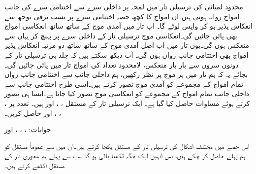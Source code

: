محدود لمبائی کی ترسیلی تار میں لمحہ  پر داخلی سرے سے اختتامی سرے کی جانب  امواج روانہ ہوتی ہیں۔ان امواج کا کچھ حصہ اختتامی سرے پر نسب برقی بوجھ سے انعکاس پذیر ہو کر واپس لوٹے گا۔ اب تار میں آمدی موج کے ساتھ ساتھ انعکاسی امواج بھی پائی جائیں گی۔انعکاسی موج ترسیلی تار کے داخلی سرے پر پہنچ کر یہاں سے منعکس ہوں گی۔یوں تار میں اب اصل آمدی موج کے ساتھ ساتھ دو مرتبہ انعکاس پذیر امواج بھی اختتامی جانب رواں ہوں گی۔ آپ دیکھ سکتے ہیں کہ جلد ہی ترسیلی تار کے دونوں سروں سے بار بار منعکس، لامحدود تعداد کی امواج تار میں پائی جائیں گی۔بجائے یہ کہ ہم تار میں ہر موج پر نظر رکھیں، ہم داخلی جانب سے اختتامی جانب رواں تمام امواج کے مجموعے کو آمدی موج تصور کرتے ہیں۔اسی طرح اختتامی جانب سے داخلی جانب تمام امواج کے مجموعے کو انعکاسی موج تصور کیا جاتا ہے۔ایسا ہی تصور کرتے ہوئے  مساوات  حاصل کیا گیا ہے۔  
ایک ترسیلی تار  کے مستقل ، ،  اور  ہیں۔ تعدد  پر ، ، ،  اور  حاصل کریں۔

جوابات: ، ، ،  اور  

اس حصے میں مختلف اشکال کی ترسیلی تار کے مستقل یکجا کرتے ہیں۔ان میں سے عموماً مستقل کو ہم پہلے حاصل کر چکے ہیں، بس انہیں ایک جگہ لکھنا باقی ہو گا۔سب سے پہلے ہم محوری تار کے مستقل اکٹھے کرتے ہیں۔

